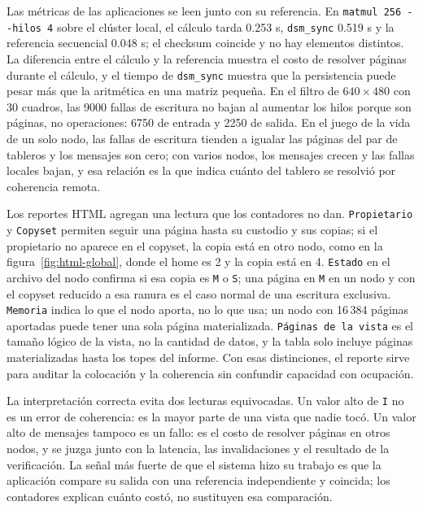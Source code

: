 Las métricas de las aplicaciones se leen junto con su referencia. En \texttt{matmul 256 -{}-hilos 4} sobre el clúster local, el cálculo tarda 0.253 s, \texttt{dsm\_sync} 0.519 s y la referencia secuencial 0.048 s; el checksum coincide y no hay elementos distintos. La diferencia entre el cálculo y la referencia muestra el costo de resolver páginas durante el cálculo, y el tiempo de \texttt{dsm\_sync} muestra que la persistencia puede pesar más que la aritmética en una matriz pequeña. En el filtro de $640 \times 480$ con 30 cuadros, las 9000 fallas de escritura no bajan al aumentar los hilos porque son páginas, no operaciones: 6750 de entrada y 2250 de salida. En el juego de la vida de un solo nodo, las fallas de escritura tienden a igualar las páginas del par de tableros y los mensajes son cero; con varios nodos, los mensajes crecen y las fallas locales bajan, y esa relación es la que indica cuánto del tablero se resolvió por coherencia remota.

Los reportes HTML agregan una lectura que los contadores no dan. \texttt{Propietario} y \texttt{Copyset} permiten seguir una página hasta su custodio y sus copias; si el propietario no aparece en el copyset, la copia está en otro nodo, como en la figura~\ref{fig:html-global}, donde el home es 2 y la copia está en 4. \texttt{Estado} en el archivo del nodo confirma si esa copia es \texttt{M} o \texttt{S}; una página en \texttt{M} en un nodo y con el copyset reducido a esa ranura es el caso normal de una escritura exclusiva. \texttt{Memoria} indica lo que el nodo aporta, no lo que usa; un nodo con 16\,384 páginas aportadas puede tener una sola página materializada. \texttt{Páginas de la vista} es el tamaño lógico de la vista, no la cantidad de datos, y la tabla solo incluye páginas materializadas hasta los topes del informe. Con esas distinciones, el reporte sirve para auditar la colocación y la coherencia sin confundir capacidad con ocupación.

La interpretación correcta evita dos lecturas equivocadas. Un valor alto de \texttt{I} no es un error de coherencia: es la mayor parte de una vista que nadie tocó. Un valor alto de mensajes tampoco es un fallo: es el costo de resolver páginas en otros nodos, y se juzga junto con la latencia, las invalidaciones y el resultado de la verificación. La señal más fuerte de que el sistema hizo su trabajo es que la aplicación compare su salida con una referencia independiente y coincida; los contadores explican cuánto costó, no sustituyen esa comparación.

